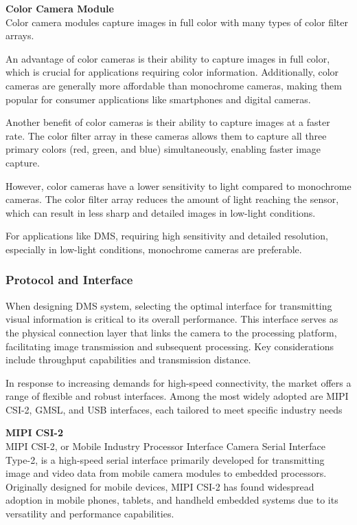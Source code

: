 \textbf{Color Camera Module} \\
Color camera modules capture images in full color with many types of color filter arrays.

An advantage of color cameras is their ability to capture images in full color, which is crucial for applications requiring color information. Additionally, color cameras are generally more affordable than monochrome cameras, making them popular for consumer applications like smartphones and digital cameras.

Another benefit of color cameras is their ability to capture images at a faster rate. The color filter array in these cameras allows them to capture all three primary colors (red, green, and blue) simultaneously, enabling faster image capture.

However, color cameras have a lower sensitivity to light compared to monochrome cameras. The color filter array reduces the amount of light reaching the sensor, which can result in less sharp and detailed images in low-light conditions.

For applications like DMS, requiring high sensitivity and detailed resolution, especially in low-light conditions, monochrome cameras are preferable.

\subsubsection{\textbf{Protocol and Interface}}

When designing DMS system, selecting the optimal interface for transmitting visual information is critical to its overall performance. This interface serves as the physical connection layer that links the camera to the processing platform, facilitating image transmission and subsequent processing. Key considerations include throughput capabilities and transmission distance.

In response to increasing demands for high-speed connectivity, the market offers a range of flexible and robust interfaces. Among the most widely adopted are MIPI CSI-2, GMSL, and USB interfaces, each tailored to meet specific industry needs

\textbf{MIPI CSI-2}\\ 
MIPI CSI-2, or Mobile Industry Processor Interface Camera Serial Interface Type-2, is a high-speed serial interface primarily developed for transmitting image and video data from mobile camera modules to embedded processors. Originally designed for mobile devices, MIPI CSI-2 has found widespread adoption in mobile phones, tablets, and handheld embedded systems due to its versatility and performance capabilities.

